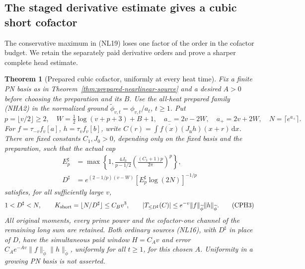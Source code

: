 \documentclass[11pt]{article}
\newtheorem{theorem}{Theorem}
\theoremstyle{remark}\newtheorem{remark}[theorem]{Remark}
\newcommand{\dd}{\,\mathrm d}
\begin{document}
\subsection{The staged derivative estimate gives a cubic short cofactor}
\label{sec:cubic-prepared-source}
The conservative maximum in (NL19) loses one factor of the
order in the cofactor budget. We retain the separately paid
derivative orders and prove a sharper complete head estimate.

\begin{theorem}[Prepared cubic cofactor, uniformly at every heat time]
\label{thm:cubic-prepared-source}
Fix a finite PN basis as in Theorem~\ref{thm:prepared-nearlinear-source}
and a desired \(A>0\) before choosing the preparation and its \(B\).
Use the all-heat prepared family (NHA2) in the normalized
ground \(\widetilde\phi_{v,t}=\phi_{v,t}/a_t\), \(t\ge1\).
Put
\[
 p=\lfloor v/2\rfloor\ge2,\quad
 W=\tfrac12\log(v+p+3)+B+1,\quad
 a_-=2v-2W,\quad a_+=2v+2W,\quad N=\lceil e^{a_+}\rceil.
                                                               \tag{CPH1}
\]
For \(f=\tau_{-v}f_v[a]\), \(h=\tau_vf_v[b]\), write
\(C(r)=\int\overline{f(x)}(J_{\mathrm n}h)(x+r)\dd x\).
There are fixed constants \(C_1,J_0>0\), depending only on
the fixed basis and the preparation, such that the actual cap
\[
 \begin{split}
 E_p^\sharp&=\max\left\{1,\frac{4J_0}{p-1/2}
                 \left(\frac{(C_1+1)p}{2\pi}\right)^p\right\},\\
 D^\sharp&=e^{(2-1/p)(v-W)}
                          [E_p^\sharp\log(2N)]^{-1/p}
 \end{split}                                                   \tag{CPH2}
\]
satisfies, for all sufficiently large \(v\),
\[
 1<D^\sharp<N,\qquad
 K_{\rm short}=\lfloor N/D^\sharp\rfloor\le C_Bv^3,\qquad
 |T_{\le D^\sharp}(C)|
      \le e^{-v}\|f\|_{\widetilde\phi}\|h\|_{\widetilde\phi}.
                                                               \tag{CPH3}
\]
All original moments, every prime power and the cofactor-one
channel of the remaining long sum are retained.
Both ordinary sources (NL16), with \(D^\sharp\) in place of \(D\),
have the simultaneous paid window \(H=C_Av\) and error
\(C_Ae^{-Av}\|f\|_{\widetilde\phi}\|h\|_{\widetilde\phi}\),
uniformly for all \(t\ge1\), for this chosen \(A\).
Uniformity in a growing PN basis is not asserted.
\end{theorem}
\end{document}
